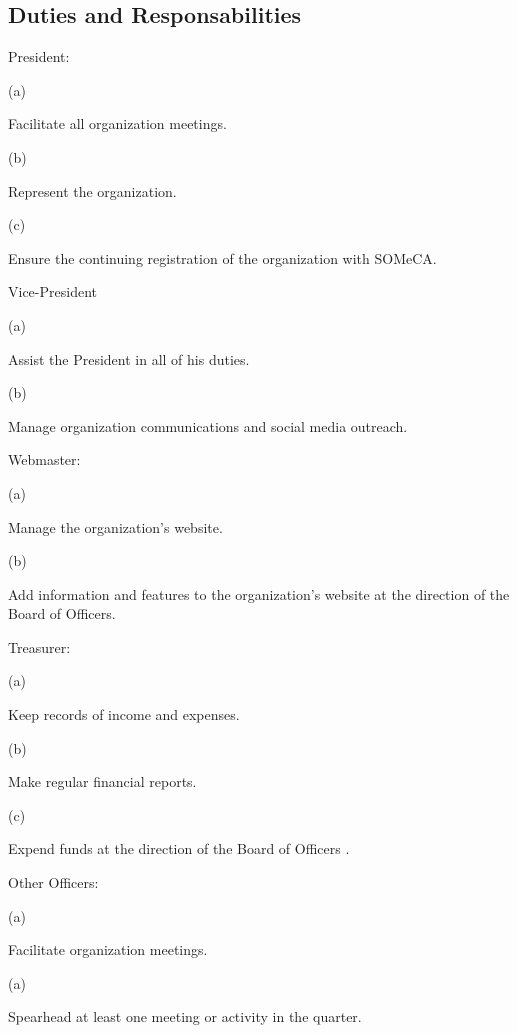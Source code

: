 \documentclass{article}
\newcommand{\SubItem}[1]{
    {\setlength\itemindent{15pt} \item[] #1}
}
\begin{document}
\subsection{Duties and Responsabilities}
\begin{itemize}
    \item[1.] President:
        \SubItem{(a)} Facilitate all organization meetings.
        \SubItem{(b)} Represent the organization.
        \SubItem{(c)} Ensure the continuing registration of the organization with SOMeCA.
    \item[] %
    \item[2.] Vice-President
        \SubItem{(a)} Assist the President in all of his duties.
        \SubItem{(b)} Manage organization communications and social media outreach.
    \item[] %
    \item[3.] Webmaster:
        \SubItem{(a)} Manage the organization's website. 
        \SubItem{(b)} Add information and features to the organization's website at the 
        direction of the Board of Officers.
    \item[] %
    \item[4.] Treasurer: 
        \SubItem{(a)} Keep records of income and expenses. 
        \SubItem{(b)} Make regular financial reports.
        \SubItem{(c)} Expend funds at the direction of the Board of Officers .
    \item[] %
    \item[5.] Other Officers:
        \SubItem{(a)} Facilitate organization meetings.
        \SubItem{(a)} Spearhead at least one meeting or activity in the quarter.
\end{itemize}
\end{document}
